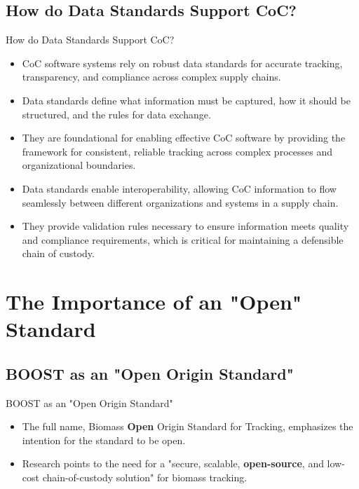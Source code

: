 \documentclass[presentation]{beamer}
\begin{document}
\subsection{How do Data Standards Support CoC?}
\label{sec:how-standards-support-coc}

\begin{frame}{How do Data Standards Support CoC?}
\begin{itemize}
\item CoC software systems rely on robust data standards for accurate tracking, transparency, and compliance across complex supply chains.
\item Data standards define what information must be captured, how it should be structured, and the rules for data exchange.
\item They are foundational for enabling effective CoC software by providing the framework for consistent, reliable tracking across complex processes and organizational boundaries.
\item Data standards enable interoperability, allowing CoC information to flow seamlessly between different organizations and systems in a supply chain.
\item They provide validation rules necessary to ensure information meets quality and compliance requirements, which is critical for maintaining a defensible chain of custody.
\end{itemize}
\end{frame}

\section{The Importance of an "Open" Standard}
\label{sec:open-standard}

\subsection{BOOST as an "Open Origin Standard"}
\label{sec:boost-open-origin}

\begin{frame}{BOOST as an "Open Origin Standard"}
\begin{itemize}
\item The full name, Biomass \textbf{Open} Origin Standard for Tracking, emphasizes the intention for the standard to be open.
\item Research points to the need for a "secure, scalable, \textbf{open-source}, and low-cost chain-of-custody solution" for biomass tracking.
\end{itemize}
\end{frame}
\end{document}
